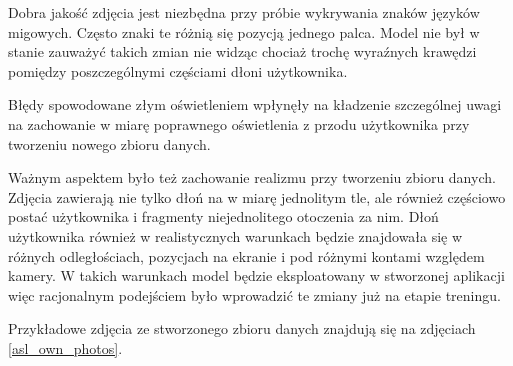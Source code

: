 \documentclass[a4paper,12pt,oneside]{book} %
\begin{document}
Dobra jakość zdjęcia jest niezbędna przy próbie wykrywania znaków języków migowych. Często znaki te różnią się pozycją jednego palca. Model nie był w stanie zauważyć takich zmian nie widząc chociaż trochę wyraźnych krawędzi pomiędzy poszczególnymi częściami dłoni użytkownika.

Błędy spowodowane złym oświetleniem wpłynęły na kładzenie szczególnej uwagi na zachowanie w miarę poprawnego oświetlenia z przodu użytkownika przy tworzeniu nowego zbioru danych.

Ważnym aspektem było też zachowanie realizmu przy tworzeniu zbioru danych. Zdjęcia zawierają nie tylko dłoń na w miarę jednolitym tle, ale również częściowo postać użytkownika i fragmenty niejednolitego otoczenia za nim. Dłoń użytkownika również w realistycznych warunkach będzie znajdowała się w różnych odległościach, pozycjach na ekranie i pod różnymi kontami względem kamery. W takich warunkach model będzie eksploatowany w stworzonej aplikacji więc racjonalnym podejściem było wprowadzić te zmiany już na etapie treningu. 

Przykładowe zdjęcia ze stworzonego zbioru danych znajdują się na zdjęciach \ref{asl_own_photos}.
\end{document}
